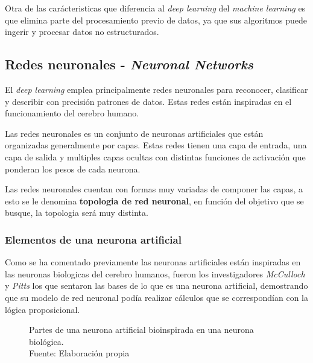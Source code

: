 Otra de las carácteristicas que diferencia al \textit{deep learning} del \textit{machine learning} es que elimina parte del procesamiento previo de datos, ya que sus algoritmos puede ingerir y procesar datos no estructurados.



\subsection{Redes neuronales - \textit{Neuronal Networks}}
El \textit{deep learning} emplea principalmente redes neuronales para reconocer, clasificar y describir con precisión patrones de datos. Estas redes están inspiradas en el funcionamiento del cerebro humano.  \cite{ibm-deep-learning}

Las redes neuronales es un conjunto de neuronas artificiales que están organizadas generalmente por capas. Estas redes tienen una capa de entrada, una capa de salida y multiples capas ocultas con distintas funciones de activación que ponderan los pesos de cada neurona.

Las redes neuronales cuentan con formas muy variadas de componer las capas, a esto se le denomina \textbf{topologia de red neuronal}, en función del objetivo que se busque, la topologia será muy distinta.

\subsubsection{Elementos de una neurona artificial}

Como se ha comentado previamente las neuronas artificiales están inspiradas en las neuronas biologicas del cerebro humanos, fueron los investigadores \textit{McCulloch} y \textit{Pitts} \cite{mcculloch1943logical} los que sentaron las bases de lo que es una neurona artificial, demostrando que su modelo de red neuronal podía realizar cálculos que se correspondían con la lógica proposicional.

\begin{figure}[H]
    \centering
    \centerline{}
    \caption{Partes de una neurona artificial bioinspirada en una neurona biológica.\\Fuente: Elaboración propia}
    \label{fig:artificial-neuron}
\end{figure}


